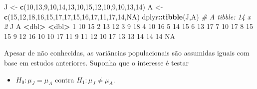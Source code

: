 \documentclass[10pt,a4paper]{book}
\newenvironment{Shaded}{\begin{snugshade}}{\end{snugshade}}
\newcommand{\KeywordTok}[1]{\textcolor[rgb]{0.13,0.29,0.53}{\textbf{#1}}}
\newcommand{\DecValTok}[1]{\textcolor[rgb]{0.00,0.00,0.81}{#1}}
\newcommand{\StringTok}[1]{\textcolor[rgb]{0.31,0.60,0.02}{#1}}
\newcommand{\CommentTok}[1]{\textcolor[rgb]{0.56,0.35,0.01}{\textit{#1}}}
\newcommand{\OtherTok}[1]{\textcolor[rgb]{0.56,0.35,0.01}{#1}}
\newcommand{\OperatorTok}[1]{\textcolor[rgb]{0.81,0.36,0.00}{\textbf{#1}}}
\newcommand{\ErrorTok}[1]{\textcolor[rgb]{0.64,0.00,0.00}{\textbf{#1}}}
\newcommand{\NormalTok}[1]{#1}
\providecommand{\tightlist}{%
  \setlength{\itemsep}{0pt}\setlength{\parskip}{0pt}}
\begin{document}
\begin{Shaded}
\begin{Highlighting}[]
\NormalTok{J <-}\StringTok{ }\KeywordTok{c}\NormalTok{(}\DecValTok{10}\NormalTok{,}\DecValTok{13}\NormalTok{,}\DecValTok{9}\NormalTok{,}\DecValTok{10}\NormalTok{,}\DecValTok{14}\NormalTok{,}\DecValTok{13}\NormalTok{,}\DecValTok{10}\NormalTok{,}\DecValTok{15}\NormalTok{,}\DecValTok{12}\NormalTok{,}\DecValTok{10}\NormalTok{,}\DecValTok{9}\NormalTok{,}\DecValTok{10}\NormalTok{,}\DecValTok{13}\NormalTok{,}\DecValTok{14}\NormalTok{)}
\NormalTok{A <-}\StringTok{ }\KeywordTok{c}\NormalTok{(}\DecValTok{15}\NormalTok{,}\DecValTok{12}\NormalTok{,}\DecValTok{18}\NormalTok{,}\DecValTok{16}\NormalTok{,}\DecValTok{15}\NormalTok{,}\DecValTok{17}\NormalTok{,}\DecValTok{17}\NormalTok{,}\DecValTok{15}\NormalTok{,}\DecValTok{16}\NormalTok{,}\DecValTok{17}\NormalTok{,}\DecValTok{11}\NormalTok{,}\DecValTok{17}\NormalTok{,}\DecValTok{14}\NormalTok{,}\OtherTok{NA}\NormalTok{)}
\NormalTok{dplyr}\OperatorTok{::}\KeywordTok{tibble}\NormalTok{(J,A)}
\CommentTok{# A tibble: 14 x 2}
\NormalTok{       J     A}
   \OperatorTok{<}\NormalTok{dbl}\OperatorTok{>}\StringTok{ }\ErrorTok{<}\NormalTok{dbl}\OperatorTok{>}
\StringTok{ }\DecValTok{1}    \DecValTok{10}    \DecValTok{15}
 \DecValTok{2}    \DecValTok{13}    \DecValTok{12}
 \DecValTok{3}     \DecValTok{9}    \DecValTok{18}
 \DecValTok{4}    \DecValTok{10}    \DecValTok{16}
 \DecValTok{5}    \DecValTok{14}    \DecValTok{15}
 \DecValTok{6}    \DecValTok{13}    \DecValTok{17}
 \DecValTok{7}    \DecValTok{10}    \DecValTok{17}
 \DecValTok{8}    \DecValTok{15}    \DecValTok{15}
 \DecValTok{9}    \DecValTok{12}    \DecValTok{16}
\DecValTok{10}    \DecValTok{10}    \DecValTok{17}
\DecValTok{11}     \DecValTok{9}    \DecValTok{11}
\DecValTok{12}    \DecValTok{10}    \DecValTok{17}
\DecValTok{13}    \DecValTok{13}    \DecValTok{14}
\DecValTok{14}    \DecValTok{14}    \OtherTok{NA}
\end{Highlighting}
\end{Shaded}

Apesar de não conhecidas, as variâncias populacionais são assumidas
iguais com base em estudos anteriores. Suponha que o interesse é testar

\begin{itemize}
\tightlist
\item
  \(H_0: \mu_J = \mu_A\) contra \(H_1: \mu_J \neq \mu_A\).
\end{itemize}
\end{document}
